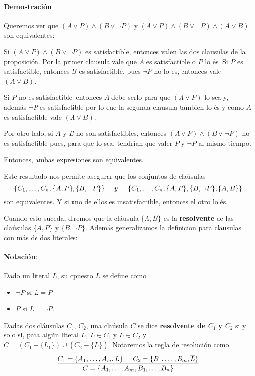 \begin{centrado}
\paragraph{Demostración} Queremos ver que $(A\lor P)\land (B\lor \lnot P)$ y $(A\lor P)\land (B\lor \lnot P) \land (A \lor B)$ son equivalentes:

Si $(A\lor P)\land (B\lor \lnot P)$ es satisfactible, entonces valen las dos clausulas de la proposición. Por la primer clausula vale que $A$ es satisfactible o $P$ lo és. Si $P$ es satisfactible, entonces $B$ es satisfactible, pues $\lnot P$ no lo es, entonces vale $(A\lor B)$.

Si $P$ no es satisfactible, entonces $A$ debe serlo para que $(A\lor P)$ lo sea y, además $\lnot P$ es satisfactible por lo que la segunda clausula tambien lo és y como $A$ es satisfactible vale $(A\lor B)$.

Por otro lado, si $A$ y $B$ no son satisfactibles, entonces $(A\lor P)\land (B\lor \lnot P)$ no es satisfactible pues, para que lo sea, tendrían que valer $P$ y $\lnot P$ al mismo tiempo.

Entonces, ambas expresiones son equivalentes.

\end{centrado}

Este resultado nos permite asegurar que los conjuntos de claúsulas 
$$\{C_1,\dots,C_n,\{A,P\}, \{B,\lnot P\}\}\hspace*{5mm}y\hspace*{5mm}\{C_1,\dots,C   _n,\{A,P\}, \{B,\lnot P\}, \{A,B\}\}$$
son equivalentes. Y si uno de ellos es insatisfactible, entonces el otro lo és.

Cuando esto suceda, diremos que la cláusula $\{A,B\}$ es la \textbf{resolvente} de las claúsulas $\{A,P\}$ y $\{B,\lnot P\}$. Además generalizamos la definicion para clausulas con más de dos literales:

\paragraph{Notación:} Dado un literal $L$,  su opuesto $\overline{L}$ se define como
\begin{itemize}
\item  $\lnot P$ si $L=P$ 
\item $P$ si $L=\lnot P$.
\end{itemize}


\vspace*{5mm}
Dadas dos cláusulas $C_1$, $C_2$, una claúsula $C$ se dice \textbf{resolvente de $C_1$ y $C_2$} si y solo si, para algún literal $L$, $L\in C_1$ y $\overline{L}\in C_2$ y $C = (C_1-\{L_1\})\cup(C_2-\{\overline{L}\})$. Notaremos la regla de resolución como
$$\frac{C_1 = \{A_1,\dots,A_m,L\}\hspace*{5mm} C_2 = \{B_1,\dots,B_m, \overline{L}\}}{C = \{A_1,\dots,A_m, B_1,\dots,B_n\}}$$


